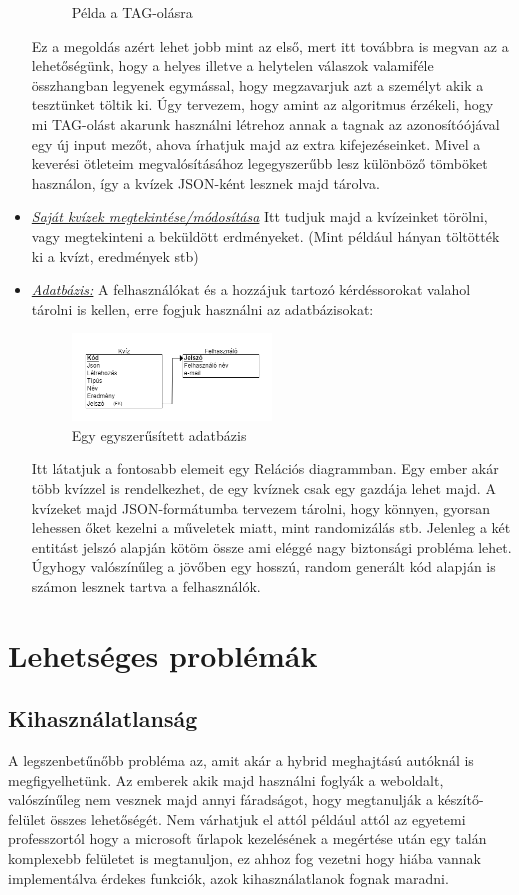 \documentclass[a4paper,12pt]{article}
\begin{document}
\begin{itemize}
\begin{figure}[h]
    			\caption{Példa a TAG-olásra}
    			\label{fig: Példa a TAG-olásra}	
		\end{figure}
Ez a megoldás azért lehet jobb mint az első, mert itt továbbra is megvan az a lehetőségünk, hogy a helyes illetve a helytelen válaszok valamiféle összhangban legyenek egymással, hogy megzavarjuk azt a személyt akik a tesztünket töltik ki. Úgy tervezem, hogy amint az algoritmus érzékeli, hogy mi TAG-olást akarunk használni létrehoz annak a tagnak az azonosítóójával egy új input mezőt, ahova írhatjuk majd az extra kifejezéseinket. Mivel a keverési ötleteim megvalósításához legegyszerűbb lesz különböző tömböket használon, így a kvízek JSON-ként lesznek majd tárolva.
	\item \textit{\underline{Saját kvízek megtekintése/módosítása}} Itt tudjuk majd a kvízeinket törölni, vagy megtekinteni a beküldött erdményeket. (Mint például hányan töltötték ki a kvízt, eredmények stb)
	\item \textit{\underline{Adatbázis:}} A felhasználókat és a hozzájuk tartozó kérdéssorokat valahol tárolni is kellen, erre fogjuk használni az adatbázisokat:
		\begin{figure}[h]
    			\centering
    			\includegraphics[width=0.5\textwidth]{database.png}
    			\caption{Egy egyszerűsített adatbázis}
    			\label{fig:Egy egyszerűsített adatbázis}	
		\end{figure}
		Itt látatjuk a fontosabb elemeit egy Relációs diagrammban. Egy ember akár több kvízzel is rendelkezhet, de egy kvíznek csak egy gazdája lehet majd. A kvízeket majd JSON-formátumba tervezem tárolni, hogy könnyen, gyorsan lehessen őket kezelni a műveletek miatt, mint randomizálás stb. Jelenleg a két entitást jelszó alapján kötöm össze ami eléggé nagy biztonsági probléma lehet. Úgyhogy valószínűleg a jövőben egy hosszú, random generált kód alapján is számon lesznek tartva a felhasználók.
\end{itemize}

\section{Lehetséges problémák}
\subsection{Kihasználatlanság}
A legszenbetűnőbb probléma az, amit akár a hybrid meghajtású autóknál is megfigyelhetünk. Az emberek akik majd használni foglyák a weboldalt, valószínűleg nem vesznek majd annyi fáradságot, hogy megtanulják a készítő-felület összes lehetőségét. Nem várhatjuk el attól például attól az egyetemi professzortól hogy a microsoft űrlapok kezelésének a megértése után egy talán komplexebb felületet is megtanuljon, ez ahhoz fog vezetni hogy hiába vannak implementálva érdekes funkciók, azok kihasználatlanok fognak maradni.
\end{document}
